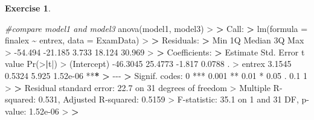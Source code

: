 \documentclass[
]{book}
\newenvironment{Shaded}{\begin{snugshade}}{\end{snugshade}}
\newcommand{\AttributeTok}[1]{\textcolor[rgb]{0.77,0.63,0.00}{#1}}
\newcommand{\CommentTok}[1]{\textcolor[rgb]{0.56,0.35,0.01}{\textit{#1}}}
\newcommand{\DecValTok}[1]{\textcolor[rgb]{0.00,0.00,0.81}{#1}}
\newcommand{\ErrorTok}[1]{\textcolor[rgb]{0.64,0.00,0.00}{\textbf{#1}}}
\newcommand{\FloatTok}[1]{\textcolor[rgb]{0.00,0.00,0.81}{#1}}
\newcommand{\FunctionTok}[1]{\textcolor[rgb]{0.00,0.00,0.00}{#1}}
\newcommand{\NormalTok}[1]{#1}
\newcommand{\SpecialCharTok}[1]{\textcolor[rgb]{0.00,0.00,0.00}{#1}}
\newcommand{\StringTok}[1]{\textcolor[rgb]{0.31,0.60,0.02}{#1}}
\theoremstyle{definition}
\theoremstyle{definition}
\theoremstyle{definition}
\newtheorem{exercise}{Exercise}[chapter]
\theoremstyle{definition}
\theoremstyle{remark}
\begin{document}
\begin{exercise}
\begin{Shaded}
\begin{Highlighting}[]
\CommentTok{\#compare model1 and model3}
\FunctionTok{anova}\NormalTok{(model1, model3)}
\SpecialCharTok{\textgreater{}} 
\ErrorTok{\textgreater{}}\NormalTok{ Call}\SpecialCharTok{:}
\ErrorTok{\textgreater{}} \FunctionTok{lm}\NormalTok{(}\AttributeTok{formula =}\NormalTok{ finalex }\SpecialCharTok{\textasciitilde{}}\NormalTok{ entrex, }\AttributeTok{data =}\NormalTok{ ExamData)}
\SpecialCharTok{\textgreater{}} 
\ErrorTok{\textgreater{}}\NormalTok{ Residuals}\SpecialCharTok{:}
\ErrorTok{\textgreater{}}\NormalTok{     Min      1Q  Median      3Q     Max }
\SpecialCharTok{\textgreater{}} \SpecialCharTok{{-}}\FloatTok{54.494} \SpecialCharTok{{-}}\FloatTok{21.185}   \FloatTok{3.733}  \FloatTok{18.124}  \FloatTok{30.969} 
\SpecialCharTok{\textgreater{}} 
\ErrorTok{\textgreater{}}\NormalTok{ Coefficients}\SpecialCharTok{:}
\ErrorTok{\textgreater{}}\NormalTok{             Estimate Std. Error t value }\FunctionTok{Pr}\NormalTok{(}\SpecialCharTok{\textgreater{}}\ErrorTok{|}\NormalTok{t}\SpecialCharTok{|}\NormalTok{)    }
\SpecialCharTok{\textgreater{}}\NormalTok{ (Intercept) }\SpecialCharTok{{-}}\FloatTok{46.3045}    \FloatTok{25.4773}  \SpecialCharTok{{-}}\FloatTok{1.817}   \FloatTok{0.0788}\NormalTok{ .  }
\SpecialCharTok{\textgreater{}}\NormalTok{ entrex        }\FloatTok{3.1545}     \FloatTok{0.5324}   \FloatTok{5.925} \FloatTok{1.52e{-}06} \SpecialCharTok{**}\ErrorTok{*}
\ErrorTok{\textgreater{}} \SpecialCharTok{{-}{-}{-}}
\ErrorTok{\textgreater{}}\NormalTok{ Signif. codes}\SpecialCharTok{:}  \DecValTok{0} \StringTok{\textquotesingle{}***\textquotesingle{}} \FloatTok{0.001} \StringTok{\textquotesingle{}**\textquotesingle{}} \FloatTok{0.01} \StringTok{\textquotesingle{}*\textquotesingle{}} \FloatTok{0.05} \StringTok{\textquotesingle{}.\textquotesingle{}} \FloatTok{0.1} \StringTok{\textquotesingle{} \textquotesingle{}} \DecValTok{1}
\SpecialCharTok{\textgreater{}} 
\ErrorTok{\textgreater{}}\NormalTok{ Residual standard error}\SpecialCharTok{:} \FloatTok{22.7}\NormalTok{ on }\DecValTok{31}\NormalTok{ degrees of freedom}
\SpecialCharTok{\textgreater{}}\NormalTok{ Multiple R}\SpecialCharTok{{-}}\NormalTok{squared}\SpecialCharTok{:}  \FloatTok{0.531}\NormalTok{,   Adjusted R}\SpecialCharTok{{-}}\NormalTok{squared}\SpecialCharTok{:}  \FloatTok{0.5159} 
\SpecialCharTok{\textgreater{}}\NormalTok{ F}\SpecialCharTok{{-}}\NormalTok{statistic}\SpecialCharTok{:}  \FloatTok{35.1}\NormalTok{ on }\DecValTok{1}\NormalTok{ and }\DecValTok{31}\NormalTok{ DF,  p}\SpecialCharTok{{-}}\NormalTok{value}\SpecialCharTok{:} \FloatTok{1.52e{-}06}
\SpecialCharTok{\textgreater{}} 
\ErrorTok{\textgreater{}} 

\end{Highlighting}
\end{Shaded}
\end{exercise}
\end{document}
